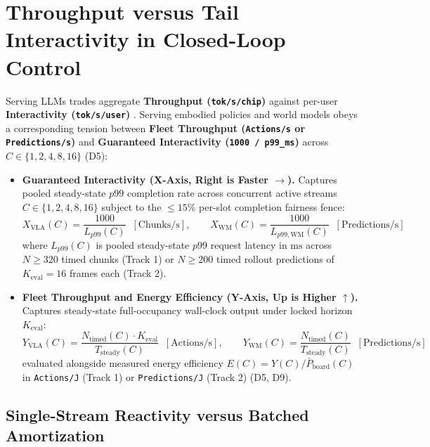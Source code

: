 \documentclass[10pt,letterpaper]{article}
\begin{document}
\section{Throughput versus Tail Interactivity in Closed-Loop Control}

Serving LLMs trades aggregate \textbf{Throughput (\texttt{tok/s/chip})} against per-user \textbf{Interactivity (\texttt{tok/s/user})} \cite{Patel2025inferencemax,Patel2026inferencexv2}. Serving embodied policies and world models obeys a corresponding tension between \textbf{Fleet Throughput (\texttt{Actions/s} or \texttt{Predictions/s})} and \textbf{Guaranteed Interactivity (\texttt{1000 / p99\_ms})} across $C \in \{1, 2, 4, 8, 16\}$ (D5):
\begin{itemize}
    \item \textbf{Guaranteed Interactivity (X-Axis, Right is Faster $\to$).} Captures pooled steady-state $p99$ completion rate across concurrent active streams $C \in \{1, 2, 4, 8, 16\}$ subject to the $\le 15\%$ per-slot completion fairness fence:
    \begin{equation}
        X_{\text{VLA}}(C) = \frac{1000}{L_{p99}(C)} \;\; [\text{Chunks/s}], \qquad X_{\text{WM}}(C) = \frac{1000}{L_{p99,\text{WM}}(C)} \;\; [\text{Predictions/s}]
    \end{equation}
    where $L_{p99}(C)$ is pooled steady-state $p99$ request latency in $\text{ms}$ across $N \ge 320$ timed chunks (Track 1) or $N \ge 200$ timed rollout predictions of $K_{\text{eval}} = 16$ frames each (Track 2).
    \item \textbf{Fleet Throughput and Energy Efficiency (Y-Axis, Up is Higher $\uparrow$).} Captures steady-state full-occupancy wall-clock output under locked horizon $K_{\text{eval}}$:
    \begin{equation}
        Y_{\text{VLA}}(C) = \frac{N_{\text{timed}}(C) \cdot K_{\text{eval}}}{T_{\text{steady}}(C)} \;\; [\text{Actions/s}], \qquad Y_{\text{WM}}(C) = \frac{N_{\text{timed}}(C)}{T_{\text{steady}}(C)} \;\; [\text{Predictions/s}]
    \end{equation}
    evaluated alongside measured energy efficiency $E(C) = Y(C) / \bar{P}_{\text{board}}(C)$ in \texttt{Actions/J} (Track 1) or \texttt{Predictions/J} (Track 2) (D5, D9).
\end{itemize}

\subsection{Single-Stream Reactivity versus Batched Amortization}
\end{document}
